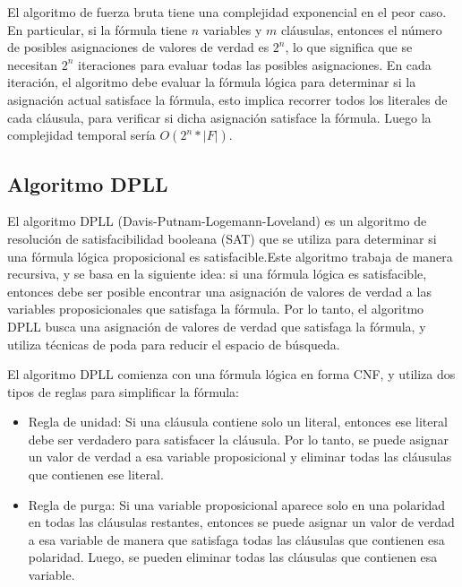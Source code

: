 \documentclass{article}
\begin{document}
        El algoritmo de fuerza bruta tiene una complejidad exponencial en el peor caso. En 
        particular, si la fórmula tiene $n$ variables y $m$ cláusulas, entonces el número
        de posibles asignaciones de valores de verdad es $2^n$, lo que significa que se necesitan 
        $2^n$ iteraciones para evaluar todas las posibles asignaciones. En cada iteración, el 
        algoritmo debe evaluar la fórmula lógica para determinar si la asignación actual satisface la 
        fórmula, esto implica recorrer todos los literales de cada cláusula, para 
        verificar si dicha asignación satisface la fórmula. Luego la complejidad temporal 
        sería $O(2^n * |F|)$.
    
    \subsection*{Algoritmo DPLL}
        El algoritmo DPLL (Davis-Putnam-Logemann-Loveland) es un algoritmo de resolución de satisfacibilidad booleana (SAT) que se utiliza 
        para determinar si una fórmula lógica proposicional es satisfacible.Este algoritmo trabaja de manera recursiva, y se basa en 
        la siguiente idea: si una fórmula lógica es satisfacible, 
        entonces debe ser posible encontrar una asignación de valores de verdad a las variables proposicionales que satisfaga la fórmula. 
        Por lo tanto, el algoritmo DPLL busca una asignación de valores de verdad que satisfaga la fórmula, y utiliza técnicas de poda para 
        reducir el espacio de búsqueda.
            
        El algoritmo DPLL comienza con una fórmula lógica en forma CNF, y utiliza dos tipos de reglas para simplificar la fórmula:
            
        \begin{itemize}
            \item Regla de unidad: Si una cláusula contiene solo un literal, entonces ese literal debe ser verdadero para 
            satisfacer la cláusula. Por lo tanto, se puede asignar un valor de verdad a esa variable proposicional y eliminar 
            todas las cláusulas que contienen ese literal.

            \item Regla de purga: Si una variable proposicional aparece solo en una polaridad en todas las cláusulas restantes, 
            entonces se puede asignar un valor de verdad a esa variable de manera que satisfaga todas las cláusulas que contienen 
            esa polaridad. Luego, se pueden eliminar todas las cláusulas que contienen esa variable.
        \end{itemize}
\end{document}
